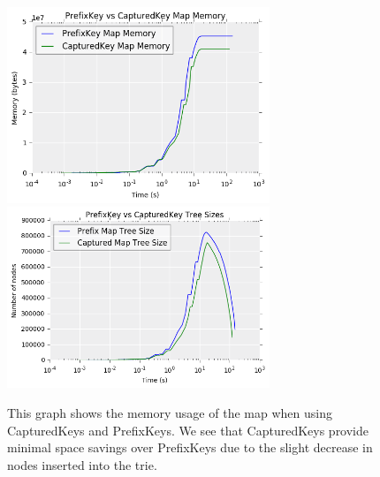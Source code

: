 \begin{figure}[t!]
\begin{center}
\includegraphics[width=0.7\textwidth]{figs/prefix-captured_pmap_mem.png}
\includegraphics[width=0.7\textwidth]{figs/prefix-captured_tree_size.png}
\end{center}
\caption{This graph shows the memory usage of the map when using CapturedKeys and PrefixKeys. We see that CapturedKeys provide minimal space savings over PrefixKeys due to the slight decrease in nodes inserted into the trie.}
\label{fig:prefix-captured}
\end{figure}



